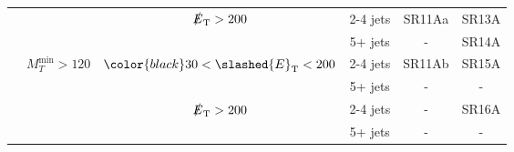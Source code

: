 \documentclass[plain,landscape]{article}
\newcommand{\met}{\slashed{E}_\mathrm{T}}
\begin{document}
\begin{table}
\begin{tabular}{|c|c|c|c|c|c|}
                             &                                             & \multirow{2}{*}{ $\met > 200$}               & 2-4 jets    & SR11Aa                  & SR13A  \\ \cline{4-6}
                             &                                             &                                              & 5+ jets     & -                       & SR14A  \\ \cline{2-6}
                             & \multirow{4}{*}{$M_T^{\textrm{min}} > 120$} & \multirow{2}{*}{ ${\color{black} 30} < \met < 200$} & 2-4 jets    & SR11Ab                  & SR15A  \\ \cline{4-6}
                             &                                             &                                              & 5+ jets     & -                       & - \\ \cline{3-6}
                             &                                             & \multirow{2}{*}{ $\met > 200$}               & 2-4 jets    & -                       & SR16A \\ \cline{4-6}
                             &                                             &                                              & 5+ jets     & -                       & - \\ \cline{1-6}
\end{tabular}
\end{table}
\end{document}
